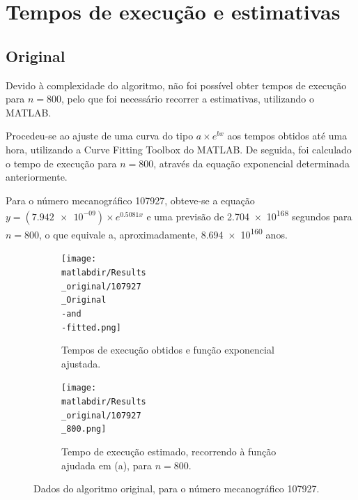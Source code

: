 \documentclass[portuguese,11pt,a4paper,titlepage]{article}
\newcommand{\matlabdir}{"../MATLAB-fittings"}
\begin{document}
\section{Tempos de execução e estimativas}
\subsection{Original}
Devido à complexidade do algoritmo, não foi possível obter tempos de execução para \begin{math}n = 800\end{math},
pelo que foi necessário recorrer a estimativas, utilizando o MATLAB.

Procedeu-se ao ajuste de uma curva do tipo \begin{math}a\times e^{bx}\end{math}
aos tempos obtidos até uma hora, utilizando a Curve Fitting Toolbox do MATLAB.
De seguida, foi calculado o tempo de execução para \begin{math}n = 800\end{math},
através da equação exponencial determinada anteriormente.

Para o número mecanográfico 107927, obteve-se a equação \begin{math}y = (\num{7.942e-09})\times e^{0.5081x}\end{math}
e uma previsão de \num{2.704e+168} segundos para \begin{math}n = 800\end{math}, o que equivale a, aproximadamente, \num{8.694e+160} anos.

\begin{figure}[h]
	\begin{subfigure}{0.47\textwidth}
	\texttt{[image: \\matlabdir/Results\\\_original/107927\\\_Original\\-and\\-fitted.png]} 
	\caption{Tempos de execução obtidos e função exponencial ajustada.}
	\label{fig:original_107927_plot}
	\end{subfigure}
	\hspace{0.049\textwidth}
	\begin{subfigure}{0.47\textwidth}
	\texttt{[image: \\matlabdir/Results\\\_original/107927\\\_800.png]}
	\caption{Tempo de execução estimado, recorrendo à função ajudada em (a), para \begin{math}n=800\end{math}.}
	\label{fig:original_107927_800}
	\end{subfigure}
	
	\caption{Dados do algoritmo original, para o número mecanográfico 107927.}
	\label{fig:original_107927}
\end{figure}
\end{document}
